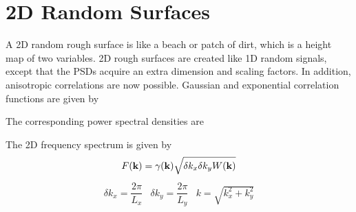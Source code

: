   {\footnotesize
{}
}

%
%

%
%
%



\section{2D Random Surfaces}

A 2D random rough surface is like a beach or patch of dirt, which is a height map of two variables.  2D rough surfaces are created like 1D random signals, except that the PSDs acquire an extra dimension and scaling factors. In addition, anisotropic correlations are now possible. Gaussian and exponential correlation functions are given by

The corresponding power spectral densities are 

The 2D frequency spectrum is given by
\begin{equation}
F(\mathbf{k}) = \gamma(\mathbf{k})\sqrt{\delta k_x \delta k_y W(\mathbf{k})} 
\end{equation}
\begin{equation}
\begin{array}{ccc}
\delta k_x = \dfrac{2\pi}{L_x} & \delta k_y = \dfrac{2\pi}{L_y} & k = \sqrt{k_x^2 + k_y^2}
\end{array}
\end{equation}

